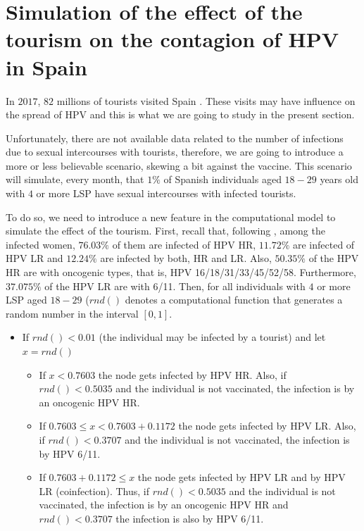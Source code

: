 \section{Simulation of the effect of the tourism on the contagion of HPV in Spain}
In $2017$, $82$ millions of tourists visited Spain \cite{INEturismo}. These visits may have influence on the spread of HPV and this is what we are going to study in the present section.

Unfortunately, there are not available data related to the number of infections due to sexual intercourses with tourists, therefore, we are going to introduce a more or less believable scenario, skewing a bit against the vaccine. This scenario will simulate, every month, that $1\%$ of Spanish individuals aged $18-29$ years old with $4$ or more LSP have sexual intercourses with infected tourists.

To do so, we need to introduce a new feature in the computational model to simulate the effect of the tourism. First, recall that, following \cite{castellsague2012prevalence}, among the infected women, $76.03\%$ of them are infected of HPV HR, $11.72\%$ are infected of HPV LR and $12.24\%$ are infected by both, HR and LR. Also, $50.35\%$ of the HPV HR are with oncogenic types, that is, HPV 16/18/31/33/45/52/58. Furthermore, $37.075\%$ of the HPV LR are with 6/11. Then, for all individuals with $4$ or more LSP aged $18-29$ ($rnd()$ denotes a computational function that generates a random number in the interval $[0,1]$.

\begin{itemize}
	\item If $rnd()<0.01$ (the individual may be infected by a tourist) and let $x=rnd()$
	\begin{itemize}
		\item If $x < 0.7603$ the node gets infected by HPV HR. Also, if $rnd() < 0.5035$ and the individual is not vaccinated, the infection is by an oncogenic HPV HR.
		\item If $0.7603 \leq x < 0.7603 + 0.1172$ the node gets infected by HPV LR. Also, if $rnd() < 0.3707$ and the individual is not vaccinated, the infection is by HPV 6/11.
		\item If $0.7603 + 0.1172 \leq x $ the node gets infected by HPV LR and by HPV LR (coinfection). Thus, if $rnd() < 0.5035$ and the individual is not vaccinated, the infection is by an oncogenic HPV HR and $rnd() < 0.3707$ the infection is also by HPV 6/11.
	\end{itemize}
\end{itemize}

